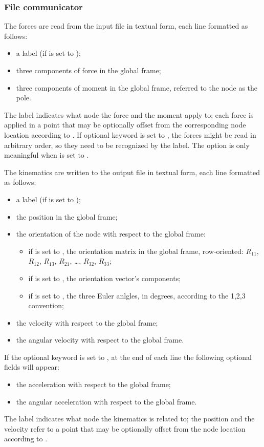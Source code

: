 \subsubsection{File communicator}
The forces are read from the input file in textual form,
each line formatted as follows:
\begin{itemize}
\item a label (if  is set to );
\item three components of force in the global frame;
\item three components of moment in the global frame,
	referred to the node as the pole.
\end{itemize}
The label indicates what node the force and the moment apply to; 
each force is applied in a point that may be optionally offset 
from the corresponding node location according to .
If optional keyword  is set to , the forces might be
read in arbitrary order, so they need to be recognized by the label.
The option  is only meaningful when  is set to .

The kinematics are written to the output file in textual form,
each line formatted as follows:
\begin{itemize}
\item a label (if  is set to );
\item the position in the global frame;
\item the orientation of the node with respect to the global frame:
\begin{itemize}
	\item if  is set to ,
	the orientation matrix in the global frame, row-oriented:
	$R_{11}$, $R_{12}$, $R_{13}$, $R_{21}$, \ldots, $R_{32}$, $R_{33}$;
	\item if  is set to ,
	the orientation vector's components;
	\item if  is set to ,
	the three Euler anlgles, in degrees, according to the 1,2,3
	convention;
\end{itemize}
\item the velocity with respect to the global frame;
\item the angular velocity with respect to the global frame.
\end{itemize}
If the optional keyword  is set to ,
at the end of each line the following optional fields will appear:
\begin{itemize}
\item the acceleration with respect to the global frame;
\item the angular acceleration with respect to the global frame.
\end{itemize}
The label indicates what node the kinematics is related to;
the position and the velocity refer to a point that may be optionally
offset from the node location according to .


